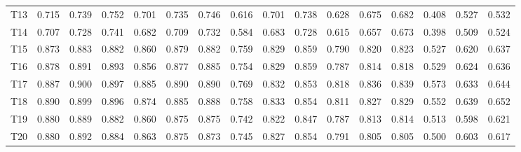 \begin{tabular}{lrrrrrrrrrrrrrrr}
T13 & 0.715 & 0.739 & 0.752 & 0.701 & 0.735 & 0.746 & 0.616 & 0.701 & 0.738 & 0.628 & 0.675 & 0.682 & 0.408 & 0.527 & 0.532 \\
T14 & 0.707 & 0.728 & 0.741 & 0.682 & 0.709 & 0.732 & 0.584 & 0.683 & 0.728 & 0.615 & 0.657 & 0.673 & 0.398 & 0.509 & 0.524 \\
T15 & 0.873 & 0.883 & 0.882 & 0.860 & 0.879 & 0.882 & 0.759 & 0.829 & 0.859 & 0.790 & 0.820 & 0.823 & 0.527 & 0.620 & 0.637 \\
T16 & 0.878 & 0.891 & 0.893 & 0.856 & 0.877 & 0.885 & 0.754 & 0.829 & 0.859 & 0.787 & 0.814 & 0.818 & 0.529 & 0.624 & 0.636 \\
T17 & 0.887 & 0.900 & 0.897 & 0.885 & 0.890 & 0.890 & 0.769 & 0.832 & 0.853 & 0.818 & 0.836 & 0.839 & 0.573 & 0.633 & 0.644 \\
T18 & 0.890 & 0.899 & 0.896 & 0.874 & 0.885 & 0.888 & 0.758 & 0.833 & 0.854 & 0.811 & 0.827 & 0.829 & 0.552 & 0.639 & 0.652 \\
T19 & 0.880 & 0.889 & 0.882 & 0.860 & 0.875 & 0.875 & 0.742 & 0.822 & 0.847 & 0.787 & 0.813 & 0.814 & 0.513 & 0.598 & 0.621 \\
T20 & 0.880 & 0.892 & 0.884 & 0.863 & 0.875 & 0.873 & 0.745 & 0.827 & 0.854 & 0.791 & 0.805 & 0.805 & 0.500 & 0.603 & 0.617 \\
\bottomrule
\end{tabular}
